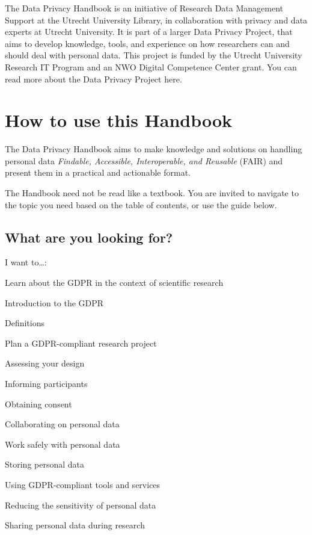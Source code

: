\documentclass[
]{book}
\begin{document}
The Data Privacy Handbook is an initiative of
Research Data Management Support
at the Utrecht University Library,
in collaboration with privacy and data experts at Utrecht University. It is part of a larger Data Privacy Project,
that aims to develop knowledge, tools, and experience on how researchers can and
should deal with personal data. This project is funded by the Utrecht University
Research IT Program and an NWO Digital Competence Center grant. You can read more
about the Data Privacy Project here.

\hypertarget{how-to-use-this-handbook}{%
\section{How to use this Handbook}\label{how-to-use-this-handbook}}

The Data Privacy Handbook aims to make knowledge and solutions on handling personal
data \emph{Findable, Accessible, Interoperable, and Reusable} (FAIR) and present them in
a practical and actionable format.

The Handbook need not be read like a textbook. You are invited to navigate to the
topic you need based on the table of contents, or use the guide below.

\hypertarget{what-are-you-looking-for}{%
\subsection{What are you looking for?}\label{what-are-you-looking-for}}

I want to\ldots:

Learn about the GDPR in the context of scientific research

Introduction to the GDPR

Definitions

Plan a GDPR-compliant research project

Assessing your design

Informing participants

Obtaining consent

Collaborating on personal data

Work safely with personal data

Storing personal data

Using GDPR-compliant tools and services

Reducing the sensitivity of personal data

Sharing personal data during research
\end{document}

